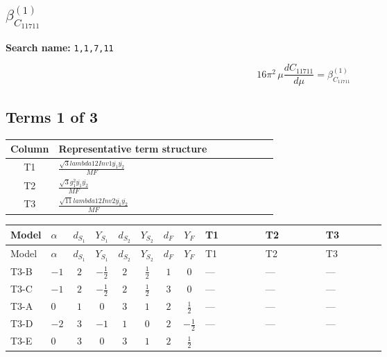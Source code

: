 \documentclass[8pt]{article}
\begin{document}
\begin{landscape}
\section*{$\beta_{C_{11711}}^{(1)}$}
\noindent\textbf{Search name: }\texttt{1,1,7,11}\par\smallskip
\[16\pi^2\,\mu\frac{d C_{11711}}{d\mu}=\beta_{C_{11711}}^{(1)}\]
\subsection*{Terms 1 of 3}
\begin{center}
\begin{tabular}{@{}c >{\raggedright\arraybackslash}p{0.82\linewidth}@{}}
\toprule
Column & Representative term structure \\
\midrule
T1 & \(\displaystyle \frac{\sqrt{3} lambda12Inv1 \overline{y_{1}} \overline{y_{2}}}{MF}\) \\
\midrule
T2 & \(\displaystyle \frac{\sqrt{3} g_{1}^{2} \overline{y_{1}} \overline{y_{2}}}{MF}\) \\
\midrule
T3 & \(\displaystyle \frac{\sqrt{11} lambda12Inv2 \overline{y_{1}} \overline{y_{2}}}{MF}\) \\
\midrule
\bottomrule
\end{tabular}
\end{center}
\smallskip
\tiny
\begin{longtable}{@{}llcccccc >{\raggedright\arraybackslash}p{0.21\linewidth} >{\raggedright\arraybackslash}p{0.21\linewidth} >{\raggedright\arraybackslash}p{0.21\linewidth}@{}}
\toprule
Model & $\alpha$ & $d_{S_1}$ & $Y_{S_1}$ & $d_{S_2}$ & $Y_{S_2}$ & $d_F$ & $Y_F$ & T1 & T2 & T3 \\
\midrule
\endfirsthead
\toprule
Model & $\alpha$ & $d_{S_1}$ & $Y_{S_1}$ & $d_{S_2}$ & $Y_{S_2}$ & $d_F$ & $Y_F$ & T1 & T2 & T3 \\
\midrule
\endhead
T3-B & $-1$ & $2$ & $-\frac{1}{2}$ & $2$ & $\frac{1}{2}$ & $1$ & $0$ & --- & --- & --- \\
\midrule
T3-C & $-1$ & $2$ & $-\frac{1}{2}$ & $2$ & $\frac{1}{2}$ & $3$ & $0$ & --- & --- & --- \\
\midrule
T3-A & $0$ & $1$ & $0$ & $3$ & $1$ & $2$ & $\frac{1}{2}$ & --- & --- & --- \\
\midrule
T3-D & $-2$ & $3$ & $-1$ & $1$ & $0$ & $2$ & $-\frac{1}{2}$ & --- & --- & --- \\
\midrule
T3-E & $0$ & $3$ & $0$ & $3$ & $1$ & $2$ & $\frac{1}{2}$ & \scriptsize\adjustbox{max width=\linewidth}{$\begin{gathered} - \frac{\sqrt{3} lambda12Inv1 \overline{y_{1}} \overline{y_{2}}}{6 MF}\end{gathered}$} & \scriptsize\adjustbox{max width=\linewidth}{$\begin{gathered} \frac{\sqrt{3} g_{1}^{2} \overline{y_{1}} \overline{y_{2}}}{8 MF}\end{gathered}$} & \scriptsize\adjustbox{max width=\linewidth}{$\begin{gathered} \frac{3 \sqrt{11} lambda12Inv2 \overline{y_{1}} \overline{y_{2}}}{22 MF}\end{gathered}$} \\

\end{longtable}
\end{landscape}
\end{document}
